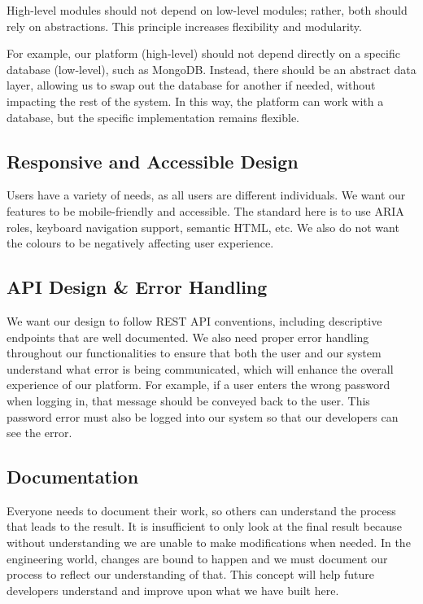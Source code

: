 \documentclass{article}
\begin{document}
High-level modules should not depend on low-level modules; rather, both should rely on abstractions. This principle increases flexibility and modularity.

For example, our platform (high-level) should not depend directly on a specific database (low-level), such as MongoDB. Instead, there should be an abstract data layer, allowing us to swap out the database for another if needed, without impacting the rest of the system. In this way, the platform can work with a database, but the specific implementation remains flexible.

\subsection*{Responsive and Accessible Design}

Users have a variety of needs, as all users are different individuals. We want our features to be mobile-friendly and accessible. The standard here is to use ARIA roles, keyboard navigation support, semantic HTML, etc. We also do not want the colours to be negatively affecting user experience.

\subsection*{API Design \& Error Handling}

We want our design to follow REST API conventions, including descriptive endpoints that are well documented. We also need proper error handling throughout our functionalities to ensure that both the user and our system understand what error is being communicated, which will enhance the overall experience of our platform. For example, if a user enters the wrong password when logging in, that message should be conveyed back to the user. This password error must also be logged into our system so that our developers can see the error.

\subsection*{Documentation}

Everyone needs to document their work, so others can understand the process that leads to the result. It is insufficient to only look at the final result because without understanding we are unable to make modifications when needed. In the engineering world, changes are bound to happen and we must document our process to reflect our understanding of that. This concept will help future developers understand and improve upon what we have built here.
\end{document}
